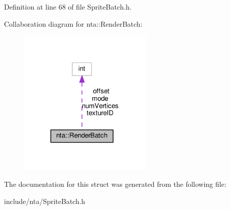 Definition at line 68 of file Sprite\+Batch.\+h.



Collaboration diagram for nta\+:\+:Render\+Batch\+:\nopagebreak
\begin{figure}[H]
\begin{center}
\leavevmode
\includegraphics[width=182pt]{df/da4/structnta_1_1RenderBatch__coll__graph}
\end{center}
\end{figure}


The documentation for this struct was generated from the following file\+:\begin{DoxyCompactItemize}
\item 
include/nta/Sprite\+Batch.\+h\end{DoxyCompactItemize}
